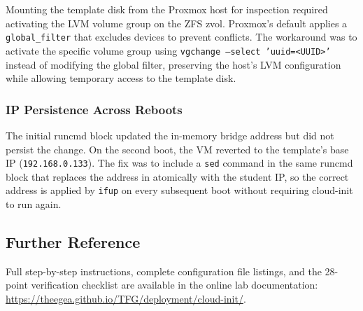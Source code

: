Mounting the template disk from the Proxmox host for inspection required
activating the LVM volume group on the ZFS zvol. Proxmox's default
 applies a \texttt{global\_filter} that excludes
 devices to prevent conflicts. The workaround was to activate
the specific volume group using \texttt{vgchange --select 'uuid=<UUID>'}
instead of modifying the global filter, preserving the host's LVM configuration
while allowing temporary access to the template disk.

\subsubsection{IP Persistence Across Reboots}

The initial runcmd block updated the in-memory bridge address but did not persist
the change. On the second boot, the VM reverted to the template's base IP
(\texttt{192.168.0.133}). The fix was to include a \texttt{sed} command in the
same runcmd block that replaces the address in
 atomically with the student IP, so the correct
address is applied by \texttt{ifup} on every subsequent boot without requiring
cloud-init to run again.

\subsection{Further Reference}

Full step-by-step instructions, complete configuration file listings, and the
28-point verification checklist are available in the online lab documentation:
\url{https://theegea.github.io/TFG/deployment/cloud-init/}.
